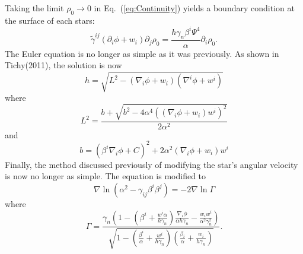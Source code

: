 \documentclass[aps,prd,amsmath,floatfix
,twocolumn
,superscriptaddress,nofootinbib,showpacs]{revtex4-1}
\theoremstyle{plain} \newtheorem{thm}{Theorem} \newtheorem{lem}{Lemma}
\begin{document}
Taking the limit $\rho_0\to 0$ in Eq.~(\ref{eq:Continuity}) yields a
boundary condition at the surface of each stars:
\begin{equation}
\tilde{\gamma}^{ij}\left(\partial_i\phi+w_i\right)\partial_j\rho_0=\frac{h\gamma_n\beta^i\Psi^4}{\alpha}\partial_i\rho_0.
\end{equation}
The Euler equation is no longer as simple as it was previously. As
shown in Tichy(2011)\cite{Tichy:2011gw}, the solution is
now
\begin{equation}
h = \sqrt{L^2 -
  \left(\nabla_i\phi+w_i\right)\left(\nabla^i\phi+w^i\right)}
\end{equation}
where
\begin{equation}
L^2 =
\frac{b+\sqrt{b^2-4\alpha^4\left(\left(\nabla_i\phi+w_i\right)w^i\right)^2}}{2\alpha^2}
\end{equation}
and
\begin{equation}
b =
\left(\beta^i\nabla_i\phi+C\right)^2+2\alpha^2\left(\nabla_i\phi+w_i\right)w^i
\end{equation}
Finally, the method discussed previously of modifying the star's
angular velocity is now no longer as simple. The equation is modified
to
 \begin{equation}
\nabla\ln\left(\alpha^2-\gamma_{ij}\beta^{i}\beta^{j}\right)=-2\nabla\ln\Gamma
\end{equation}
where
\begin{equation}
\Gamma
=\frac{\gamma_n\left(1-\left(\beta^i+\frac{w^i\alpha}{h\gamma_n}\right)\frac{\nabla_i\phi}{\alpha
    h\gamma_n}- \frac{w_i w^i}{\alpha^2\gamma_n^2}\right) } { \sqrt{ 1
    - \left(\frac{\beta^i}{\alpha}+\frac{w^i}{h\gamma_n}\right)
    \left(\frac{\beta_i}{\alpha}+\frac{w_i}{h\gamma_n}\right) } } .
\end{equation}
\end{document}
